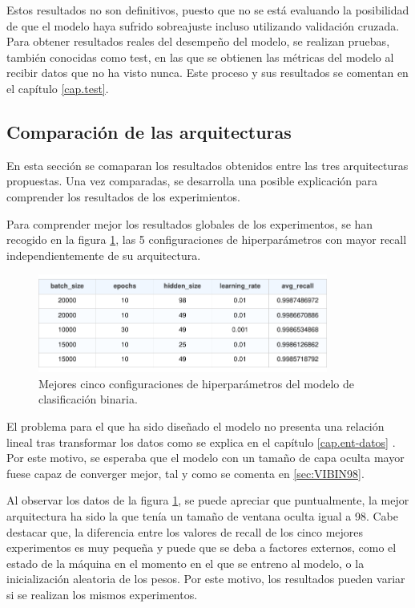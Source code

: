 Estos resultados no son definitivos, puesto que no se está evaluando la posibilidad de que el modelo haya sufrido sobreajuste incluso utilizando validación cruzada. Para obtener resultados reales del desempeño del modelo, se realizan pruebas, también conocidas como test, en las que se obtienen las métricas del modelo al recibir datos que no ha visto nunca. Este proceso y sus resultados se comentan en el capítulo \ref{cap.test}.


\subsection{Comparación de las arquitecturas} \label{sec:comp.BIN}
En esta sección se comaparan los resultados obtenidos entre las tres arquitecturas propuestas. Una vez comparadas, se desarrolla una posible explicación para comprender los resultados de los experimientos.

Para comprender mejor los resultados globales de los experimentos, se han recogido en la figura \ref{fig:BINtop5}, las 5 configuraciones de hiperparámetros con mayor recall independientemente de su arquitectura.

\begin{figure}[H]
    \centering
    \includegraphics[width=0.85\textwidth]{./img/modelo/BINtop5.pdf}
    \caption{Mejores cinco configuraciones de hiperparámetros del modelo de clasificación binaria.}
    \label{fig:BINtop5}
\end{figure}

El problema para el que ha sido diseñado el modelo no presenta una relación lineal tras transformar los datos como se explica en el capítulo \ref{cap.ent-datos} . Por este motivo, se esperaba que el modelo con un tamaño de capa oculta mayor fuese capaz de converger mejor, tal y como se comenta en \ref{sec:VIBIN98}.

Al observar los datos de la figura \ref{fig:BINtop5}, se puede apreciar que puntualmente, la mejor arquitectura ha sido la que tenía un tamaño de ventana oculta igual a 98. Cabe destacar que, la diferencia entre los valores de recall de los cinco mejores experimentos es muy pequeña y puede que se deba a factores externos, como el estado de la máquina en el momento en el que se entreno al modelo, o la inicialización aleatoria de los pesos. Por este motivo, los resultados pueden variar si se realizan los mismos experimentos.

